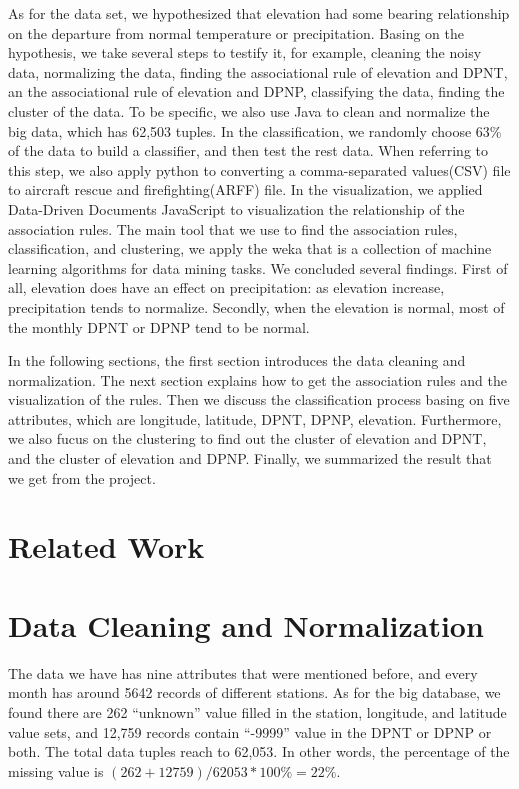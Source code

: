 \documentclass[11pt]{article}
\begin{document}
As for the data set, we hypothesized that elevation had some bearing relationship on the departure from normal temperature or precipitation. Basing on the hypothesis, we take several steps to testify it, for example, cleaning the noisy data, normalizing the data, finding the associational rule of elevation and DPNT, an the associational rule of elevation and DPNP, classifying the data, finding the cluster of the data. To be specific, we also use Java to clean and normalize the big data, which has 62,503 tuples. In the classification, we randomly choose 63\% of the data to build a classifier, and then test the rest data. When referring to this step, we also apply python to converting a comma-separated values(CSV) file to aircraft rescue and firefighting(ARFF) file. In the visualization, we applied Data-Driven Documents JavaScript to visualization the relationship of the association rules. The main tool that we use to find the association rules, classification, and clustering, we apply the weka that is a collection of machine learning algorithms for data mining tasks\cite{hall2009weka}. We concluded several findings. First of all, elevation does have an effect on precipitation: as elevation increase, precipitation tends to normalize. Secondly, when the elevation is normal, most of the monthly DPNT or DPNP tend to be normal.

In the following sections, the first section introduces the data cleaning and normalization. The next section explains how to get the association rules and the visualization of the rules. Then we discuss the classification process basing on five attributes, which are longitude, latitude, DPNT, DPNP, elevation. Furthermore, we also fucus on the clustering to find out the cluster of elevation and DPNT, and the cluster of elevation and DPNP. Finally, we summarized the result that we get from the project.

\section{Related Work}

\section{Data Cleaning and Normalization}
The data we have has nine attributes that were mentioned before, and every month has around 5642 records of different stations. As for the big database, we found there are 262 ``unknown'' value filled in the station, longitude, and latitude value sets, and 12,759 records contain ``-9999'' value in the DPNT or DPNP or both. The total data tuples reach to 62,053. In other words, the percentage of the missing value is $( 262 + 12759 ) / 62053 * 100\% = 22\% $.
\end{document}
